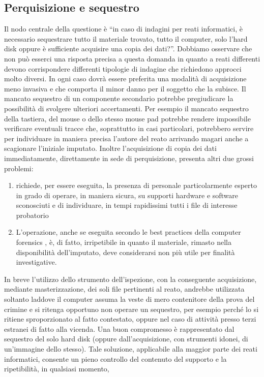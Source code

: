 \subsection{Perquisizione e sequestro}
Il nodo centrale della questione è “in caso di indagini per reati informatici, è necessario sequestrare tutto il materiale trovato, tutto il computer, solo l'hard disk oppure è sufficiente acquisire una copia dei dati?”. Dobbiamo osservare che non può esserci una risposta precisa a questa domanda in quanto a reati differenti devono corrispondere differenti tipologie di indagine che richiedono approcci molto diversi. In ogni caso dovrà essere preferita una modalità di acquisizione meno invasiva e che comporta il minor danno per il soggetto che la subisce.
Il mancato sequestro di un componente secondario potrebbe pregiudicare la possibilità di svolgere ulteriori accertamenti.  Per esempio il mancato sequestro della tastiera, del mouse o dello stesso mouse pad potrebbe
rendere impossibile verificare eventuali tracce che, soprattutto in casi particolari, potrebbero servire per individuare in maniera precisa l'autore del reato arrivando magari anche a scagionare l'iniziale imputato. Inoltre l'acquisizione di copia dei dati immediatamente, direttamente in sede di perquisizione, presenta altri due grossi problemi:
\begin{enumerate}
    \item richiede, per essere eseguita, la presenza di personale particolarmente esperto in grado di operare, in maniera sicura, su supporti hardware e software sconosciuti e di individuare, in tempi rapidissimi tutti i file di interesse probatorio 
    \item L'operazione, anche se eseguita secondo le best practices della computer forensics , è, di fatto, irripetibile in quanto il materiale, rimasto nella disponibilità dell'imputato, deve considerarsi non più utile per finalità investigative.
\end{enumerate}
In breve l'utilizzo dello strumento dell'ispezione, con la conseguente acquisizione, mediante masterizzazione, dei soli file pertinenti al reato, andrebbe utilizzata soltanto laddove il computer assuma la veste di mero contenitore della prova del crimine e si ritenga opportuno non operare un sequestro, per esempio perché lo si ritiene sproporzionato al fatto contestato, oppure nel caso di attività presso terzi estranei di fatto alla vicenda. Una buon compromesso è rappresentato dal sequestro del solo hard disk (oppure dall'acquisizione, con strumenti idonei, di un'immagine dello stesso). Tale soluzione, applicabile alla maggior parte dei reati informatici, consente un pieno controllo del contenuto del supporto e la ripetibilità, in qualsiasi momento,
